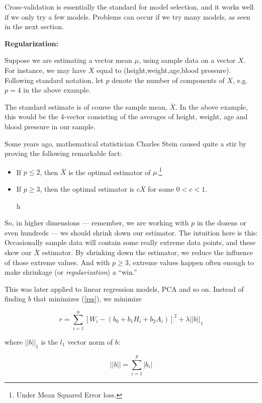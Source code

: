 Cross-validation is essentially the standard for model selection, and it
works well if we only try a few models.  Problems can occur if we try
many models, as seen in the next section.

\textbf{Regularization:}

Suppose we are estimating a vector mean $\mu$, using sample data on a
vector $X$.  For instance, we may have $X$ equal to
(height,weight,age,blood pressure).  Following standard notation, let $p$
denote the number of components of $X$, e.g. $p = 4$ in the above
example.

The standard estimate is of course the sample mean, $\overline{X}$.  In
the above example, this would be the 4-vector consisting of the averages
of height, weight, age and blood pressure in our sample.

Some years ago, mathematical statistician Charles Stein caused quite a
stir by proving the following remarkable fact:

\begin{itemize}

\item If $p \leq 2$, then $\overline{X}$ is the optimal estimator of
$\mu$.\footnote{Under Mean Squared Error loss.}

\item If $p \geq 3$, then the optimal estimator is $c \overline{X}$
for some $0 < c < 1$.

h\end{itemize} 

So, in higher dimensions --- remember, we are working with $p$ in the
dozens or even hundreds --- we should shrink down our estimator.  The
intuition here is this:  Occasionally sample data will contain some
really extreme data points, and these skew our $\overline{X}$ estimator.
By shrinking down the estimator, we reduce the influence of those
extreme values.  And with $p \geq 3$, extreme values happen often
enough to make shrinkage (or \textit{regularization}) a ``win.''

This was later applied to linear regression models, PCA and so on.
Instead of finding $b$ that minimizes (\ref{rss}), we minimize

\begin{equation}
r =
\sum_{i=1}^n [W_i - (b_0 + b_1 H_i + b_2 A_i)]^2 + \lambda ||b||_1
\end{equation}

where $||b||_1$ is the $l_1$ vector norm of $b$:

\begin{equation}
||b|| = \sum_{i=1}^p |b_i|
\end{equation}


